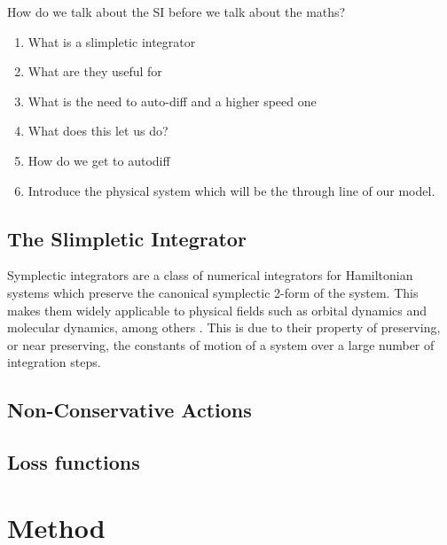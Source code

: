 \documentclass[10pt]{iopart}
\def\SI{Slimpletic Integrator }
\begin{document}

How do we talk about the SI before we talk about the maths?
\begin{enumerate}
	\item What is a slimpletic integrator
	\item What are they useful for
	\item What is the need to auto-diff and a higher speed one
	\item What \PHYSICS does this let us do?
	\item How do we get to autodiff
	\item Introduce the physical system which will be the through line of our model.
\end{enumerate}

\subsection{The \SI}

Symplectic integrators are a class of numerical integrators for Hamiltonian systems which preserve the canonical symplectic 2-form of the system.%
This makes them widely applicable to physical fields such as orbital dynamics and  molecular dynamics, among others . This is due to their property of preserving, or near preserving, the constants of motion of a system over a large number of integration steps.

\subsection{Non-Conservative Actions}
\subsection{Loss functions}



\section{Method}
\end{document}
